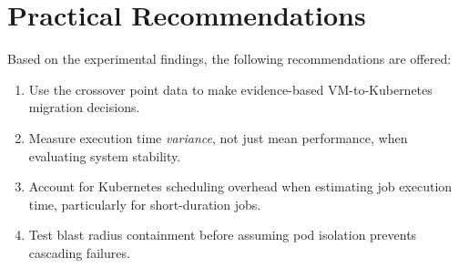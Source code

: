 
\section{Practical Recommendations}
\label{sec:recommendations}

Based on the experimental findings, the following recommendations are offered:

\begin{enumerate}
  \item Use the crossover point data to make evidence-based VM-to-Kubernetes migration decisions.
  \item Measure execution time \emph{variance}, not just mean performance, when evaluating system stability.
  \item Account for Kubernetes scheduling overhead when estimating job execution time, particularly for short-duration jobs.
  \item Test blast radius containment before assuming pod isolation prevents cascading failures.
\end{enumerate}

